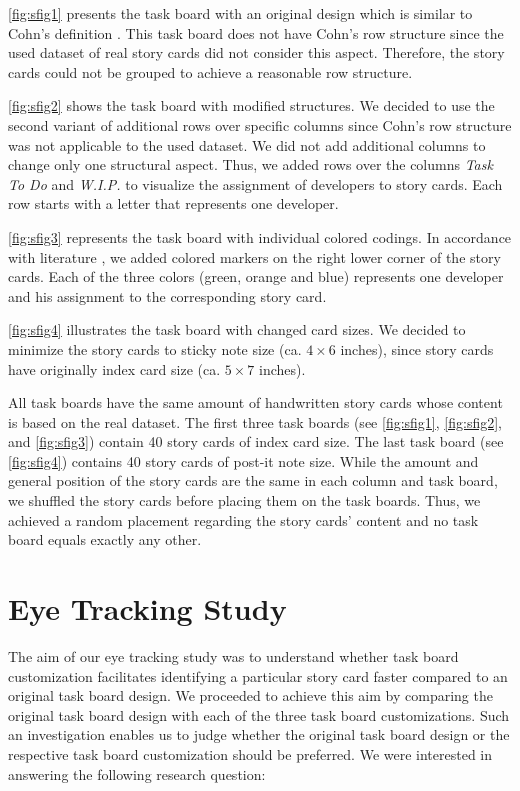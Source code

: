 \documentclass{llncs}
\begin{document}
\figurename{ \ref{fig:sfig1}} presents the task board with an original design which is similar to Cohn's definition \cite{Cohn.2012}. This task board does not have Cohn's row structure \cite{Cohn.2012} since the used dataset of real story cards did not consider this aspect. Therefore, the story cards could not be grouped to achieve a reasonable row structure.

\figurename{ \ref{fig:sfig2}} shows the task board with modified structures. We 
decided to use the second variant of additional rows over specific columns 
since Cohn's row structure \cite{Cohn.2012} was not applicable to the used 
dataset. We did not add additional columns to change only one structural 
aspect. Thus, we added rows over the columns \textit{Task To Do} and 
\textit{W.I.P.} to visualize the assignment of developers to story cards. Each 
row starts with a letter that represents one developer.

\figurename{ \ref{fig:sfig3}} represents the task board with individual colored 
codings. In accordance with literature \cite{Liskin.2014, Sharp.2006}, we added 
colored markers on the right lower corner of the story cards. Each of the three 
colors (green, orange and blue) represents one developer and his assignment to 
the corresponding story card.

\figurename{ \ref{fig:sfig4}} illustrates the task board with changed card sizes. We decided to minimize the story cards to sticky note size (ca. $4 \times 6$ inches), since story cards have originally index card size (ca. $5 \times 7$ inches).

All task boards have the same amount of handwritten story cards whose content 
is based on the real dataset. The first three task boards (see \figurename{ 
\ref{fig:sfig1}}, \figurename{ \ref{fig:sfig2}}, and \figurename{ 
\ref{fig:sfig3}}) contain 40 story cards of index card size. The last task 
board (see \figurename{ \ref{fig:sfig4}}) contains 40 story cards of post-it 
note size. While the amount and general position of the story cards are the 
same in each column and task board, we shuffled the story cards before placing 
them on the task boards. Thus, we achieved a random placement regarding the 
story cards' content and no task board equals exactly any other.

\section{Eye Tracking Study}
\label{sec:controlled-experiment}
The aim of our eye tracking study was to understand whether task 
board customization facilitates identifying a particular story card faster 
compared to an original task board design.
We proceeded to achieve this aim by comparing the original task board design 
with each of the three task board customizations. Such an investigation enables 
us to judge whether the original task board design or the respective task board 
customization should be preferred. We were interested in answering the 
following research question:
\end{document}
